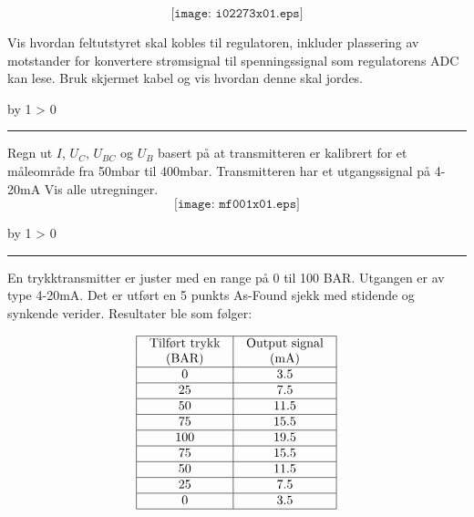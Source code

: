 \documentclass[12pt,a4paper]{article}
\def\oppgave{
            \advance\questnum by 1
            \ifnum \questnum > 0
                 \hrule
                 \vskip 3pt
                 \leftline{Oppgave \the\questnum}
                 \vskip 3pt \fi}
\begin{document}
$$\texttt{[image: i02273x01.eps]}$$

Vis hvordan feltutstyret skal kobles til regulatoren, inkluder plassering av motstander for konvertere strømsignal til spenningssignal som regulatorens ADC kan lese. Bruk skjermet kabel og vis hvordan denne skal jordes. 


\vfil 

\eject
\vskip 10pt \filbreak 
\oppgave{} 

Regn ut $I$, $U_{C}$, $U_{BC}$ og  $U_{B}$ basert på at transmitteren er kalibrert for et måleområde fra 50mbar til 400mbar. Transmitteren har et utgangssignal på 4-20mA 
Vis alle utregninger. 
$$\texttt{[image: mf001x01.eps]}$$


\vskip 10pt \filbreak 
\oppgave{} 

En trykktransmitter er juster med en range på 0 til 100 BAR. Utgangen er av type 4-20mA. 
Det er utført en 5 punkts As-Found sjekk med stidende og synkende verider. Resultater ble som følger:


$$\vbox{\offinterlineskip
\halign{\strut
\vrule \quad\hfil # \ \hfil & 
\vrule \quad\hfil # \ \hfil \vrule \cr
\noalign{\hrule}
%
Tilført trykk & Output signal \cr
%
(BAR) & (mA) \cr
%
\noalign{\hrule}
%
0 & 3.5 \cr
%
\noalign{\hrule}
%
25 & 7.5 \cr
%
\noalign{\hrule}
%
50 & 11.5 \cr
%
\noalign{\hrule}
%
75 & 15.5 \cr
%
\noalign{\hrule}
%
100 & 19.5 \cr
%
\noalign{\hrule}
%
75 & 15.5 \cr
%
\noalign{\hrule}
%
50 & 11.5 \cr
%
\noalign{\hrule}
%
25 & 7.5 \cr
%
\noalign{\hrule}
%
0 & 3.5 \cr
%
\noalign{\hrule}
} %
}$$ %
\end{document}
